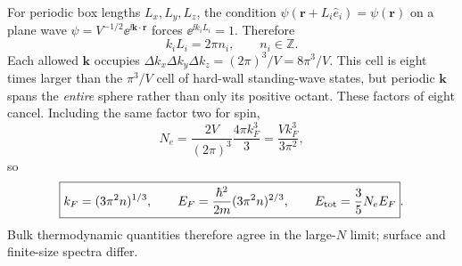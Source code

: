 For periodic box lengths $L_x,L_y,L_z$,
the condition
$\psi(\mathbf r+L_i\hat e_i)=\psi(\mathbf r)$
on a plane wave
$\psi=V^{-1/2}\ee^{\ii\mathbf k\cdot\mathbf r}$
forces $\ee^{\ii k_iL_i}=1$.
Therefore
\begin{equation}
\boxed{k_iL_i=2\pi n_i,\qquad
n_i\in\mathbb Z}.
\end{equation}
Each allowed $\mathbf k$ occupies
$\boxed{\Delta k_x\Delta k_y\Delta k_z
=(2\pi)^3/V=8\pi^3/V}$.
This cell is eight times larger
than the $\pi^3/V$ cell of hard-wall
standing-wave states, but periodic
$\mathbf k$ spans the \emph{entire}
sphere rather than only its positive
octant. These factors of eight cancel.
Including the same factor two for spin,
\begin{equation}
N_e=\frac{2V}{(2\pi)^3}
\frac{4\pi k_F^3}{3}
=\frac{Vk_F^3}{3\pi^2},
\end{equation}
so
\begin{equation}
\boxed{k_F=(3\pi^2n)^{1/3},\qquad
E_F=\frac{\hbar^2}{2m}(3\pi^2n)^{2/3},\qquad
E_{\rm tot}=\frac35N_eE_F}.
\end{equation}
Bulk thermodynamic quantities therefore
agree in the large-$N$ limit; surface
and finite-size spectra differ.
